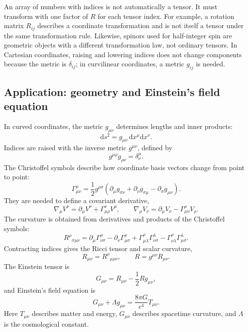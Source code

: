 An array of numbers with indices is not automatically a tensor. It must transform with one factor of $R$ for each tensor index. For example, a rotation matrix $R_{ij}$ describes a coordinate transformation and is not itself a tensor under the same transformation rule. Likewise, spinors used for half-integer spin are geometric objects with a different transformation law, not ordinary tensors. In Cartesian coordinates, raising and lowering indices does not change components because the metric is $\delta_{ij}$; in curvilinear coordinates, a metric $g_{ij}$ is needed.

\subsection{Application: geometry and Einstein's field equation}
In curved coordinates, the metric $g_{\mu\nu}$ determines lengths and inner products:
\begin{equation}
\mathrm{d}s^2=g_{\mu\nu}\,\mathrm{d}x^\mu\mathrm{d}x^\nu.
\end{equation}
Indices are raised with the inverse metric $g^{\mu\nu}$, defined by
\begin{equation}
g^{\mu\rho}g_{\rho\nu}=\delta^\mu_{\nu}.
\end{equation}
The Christoffel symbols describe how coordinate basis vectors change from point to point:
\begin{equation}
\Gamma^{\rho}_{\mu\nu}
=\frac12g^{\rho\sigma}
\left(\partial_\mu g_{\sigma\nu}
+\partial_\nu g_{\sigma\mu}
-\partial_\sigma g_{\mu\nu}\right).
\end{equation}
They are needed to define a covariant derivative,
\begin{equation}
\nabla_\mu V^\nu=\partial_\mu V^\nu+\Gamma^\nu_{\mu\rho}V^\rho,
\qquad
\nabla_\mu V_\nu=\partial_\mu V_\nu-\Gamma^\rho_{\mu\nu}V_\rho.
\end{equation}
The curvature is obtained from derivatives and products of the Christoffel symbols:
\begin{equation}
R^\rho{}_{\sigma\mu\nu}
=\partial_\mu\Gamma^\rho_{\nu\sigma}
-\partial_\nu\Gamma^\rho_{\mu\sigma}
+\Gamma^\rho_{\mu\lambda}\Gamma^\lambda_{\nu\sigma}
-\Gamma^\rho_{\nu\lambda}\Gamma^\lambda_{\mu\sigma}.
\end{equation}
Contracting indices gives the Ricci tensor and scalar curvature,
\begin{equation}
R_{\mu\nu}=R^\rho{}_{\mu\rho\nu},
\qquad
R=g^{\mu\nu}R_{\mu\nu}.
\end{equation}
The Einstein tensor is
\begin{equation}
G_{\mu\nu}=R_{\mu\nu}-\frac12Rg_{\mu\nu},
\end{equation}
and Einstein's field equation is
\begin{equation}
G_{\mu\nu}+\Lambda g_{\mu\nu}
=\frac{8\pi G}{c^4}T_{\mu\nu}.
\end{equation}
Here $T_{\mu\nu}$ describes matter and energy, $G_{\mu\nu}$ describes spacetime curvature, and $\Lambda$ is the cosmological constant.

